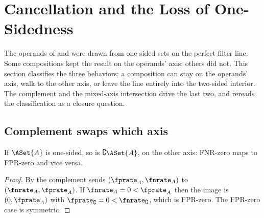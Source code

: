 %

\section{Cancellation and the Loss of One-Sidedness}
\label{sec:cancellation}

The operands of  and  were
drawn from one-sided sets on the perfect filter line. Some compositions kept
the result on the operands' axis; others did not. This section classifies the
three behaviors: a composition can stay on the operands' axis, walk to the
other axis, or leave the line entirely into the two-sided
interior. The
complement and the mixed-axis intersection drive the last two, and
 rereads the classification as a closure
question.

\subsection*{Complement swaps which axis}

\begin{proposition}
\label{prop:complement-axis-swap}
If $\ASet{A}$ is one-sided, so is $\complement \ASet{A}$, on the other axis:
FNR-zero maps to FPR-zero and vice versa.
\end{proposition}

\begin{proof}
By  the complement sends $(\fprate_A, \fnrate_A)$
to $(\fnrate_A, \fprate_A)$. If $\fnrate_A = 0 < \fprate_A$ then the image is
$(0, \fprate_A)$ with $\fprate_\complement = 0 < \fnrate_\complement$, which
is FPR-zero. The FPR-zero case is symmetric.
\end{proof}

